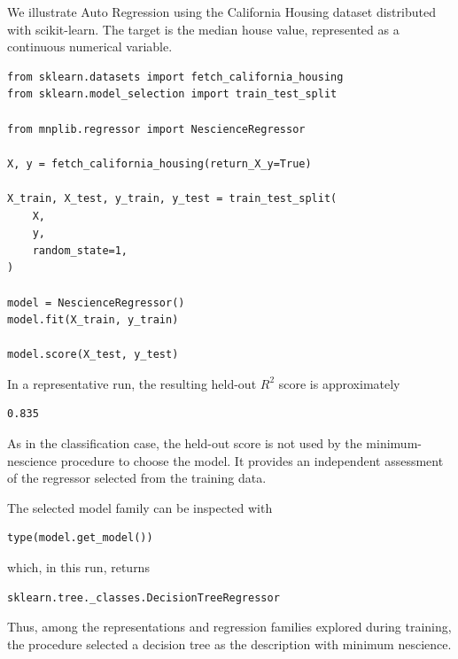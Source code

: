 \begin{example}
\label{ex:auto_regression}

We illustrate Auto Regression using the California Housing dataset distributed with scikit-learn. The target is the median house value, represented as a continuous numerical variable.

\begin{sourcecode}
{\scriptsize
\begin{verbatim}
from sklearn.datasets import fetch_california_housing
from sklearn.model_selection import train_test_split

from mnplib.regressor import NescienceRegressor

X, y = fetch_california_housing(return_X_y=True)

X_train, X_test, y_train, y_test = train_test_split(
    X,
    y,
    random_state=1,
)

model = NescienceRegressor()
model.fit(X_train, y_train)

model.score(X_test, y_test)
\end{verbatim}}
\end{sourcecode}

In a representative run, the resulting held-out \(R^2\) score is approximately

\begin{verbatim}
0.835
\end{verbatim}

As in the classification case, the held-out score is not used by the minimum-nescience procedure to choose the model. It provides an independent assessment of the regressor selected from the training data.

The selected model family can be inspected with

\begin{sourcecode}
{\scriptsize
\begin{verbatim}
type(model.get_model())
\end{verbatim}}
\end{sourcecode}

which, in this run, returns

\begin{verbatim}
sklearn.tree._classes.DecisionTreeRegressor
\end{verbatim}

Thus, among the representations and regression families explored during training, the procedure selected a decision tree as the description with minimum nescience.
\end{example}


